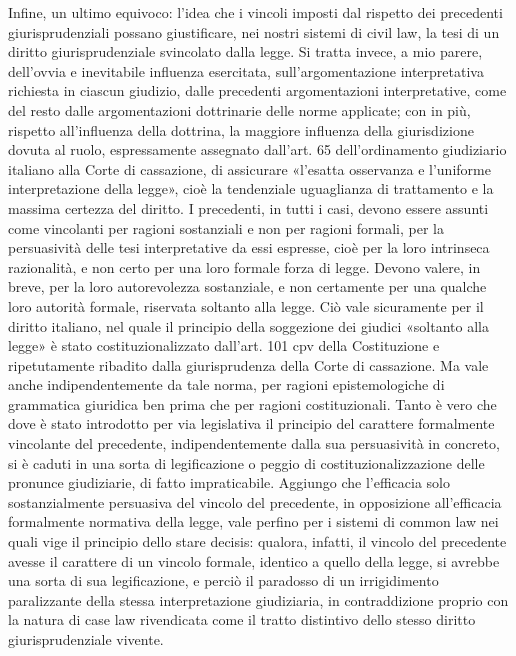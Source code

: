 Infine, un ultimo equivoco: l’idea che i vincoli imposti dal rispetto dei precedenti giurisprudenziali possano giustificare, nei nostri sistemi di civil law, la tesi di un diritto giurisprudenziale svincolato dalla legge. Si tratta invece, a mio parere, dell’ovvia e inevitabile influenza esercitata, sull’argomentazione interpretativa richiesta in ciascun giudizio, dalle precedenti argomentazioni interpretative, come del resto dalle argomentazioni dottrinarie delle norme applicate; con in più, rispetto all’influenza della dottrina, la maggiore influenza della giurisdizione dovuta al ruolo, espressamente assegnato dall’art. 65 dell’ordinamento giudiziario italiano alla Corte di cassazione, di assicurare «l’esatta osservanza e l’uniforme interpretazione della legge», cioè la tendenziale uguaglianza di trattamento e la massima certezza del diritto. I precedenti, in tutti i casi, devono essere assunti come vincolanti per ragioni sostanziali e non per ragioni formali, per la persuasività delle tesi interpretative da essi espresse, cioè per la loro intrinseca razionalità, e non certo per una loro formale forza di legge. Devono valere, in breve, per la loro autorevolezza sostanziale, e non certamente per una qualche loro autorità formale, riservata soltanto alla legge. Ciò vale sicuramente per il diritto italiano, nel quale il principio della soggezione dei giudici «soltanto alla legge» è stato costituzionalizzato dall’art. 101 cpv della Costituzione e ripetutamente ribadito dalla giurisprudenza della Corte di cassazione. Ma vale anche indipendentemente da tale norma, per ragioni epistemologiche di grammatica giuridica ben prima che per ragioni costituzionali. Tanto è vero che dove è stato introdotto per via legislativa il principio del carattere formalmente vincolante del precedente, indipendentemente dalla sua persuasività in concreto, si è caduti in una sorta di legificazione o peggio di costituzionalizzazione delle pronunce giudiziarie, di fatto impraticabile. Aggiungo che l’efficacia solo sostanzialmente persuasiva del vincolo del precedente, in opposizione all’efficacia formalmente normativa della legge, vale perfino per i sistemi di common law nei quali vige il principio dello stare decisis: qualora, infatti, il vincolo del precedente avesse il carattere di un vincolo formale, identico a quello della legge, si avrebbe una sorta di sua legificazione, e perciò il paradosso di un irrigidimento paralizzante della stessa interpretazione giudiziaria, in contraddizione proprio con la natura di case law rivendicata come il tratto distintivo dello stesso diritto giurisprudenziale vivente.

